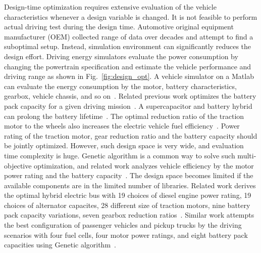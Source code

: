 Design-time optimization requires extensive evaluation of the vehicle characteristics whenever a design variable is changed. It is not feasible to perform actual driving test during the design time. Automotive original equipment manufacturer (OEM) collected range of data over decades and attempt to find a suboptimal setup. Instead, simulation environment can significantly reduces the design effort. Driving energy simulators evaluate the power consumption by changing the powertrain specification and estimate the vehicle performance and driving range as shown in Fig.~\ref{fig:design_opt}. A vehicle simulator on a Matlab can evaluate the energy consumption by the motor, battery characteristics, gearbox, vehicle chassis, and so on~\cite{Butler:TVT99,Markel:JPS02}. Related previous work optimizes the battery pack capacity for a given driving mission~\cite{Gao:TIE10}. A supercapacitor and battery hybrid can prolong the battery lifetime~\cite{Song:AE14}. The optimal reduction ratio of the traction motor to the wheels also increases the electric vehicle fuel efficiency~\cite{Yin:ITEC-AP14}. Power rating of the traction motor, gear reduction ratio and the battery capacity should be jointly optimized. However, such design space is very wide, and evaluation time complexity is huge. Genetic algorithm is a common way to solve such multi-objective optimization, and related work analyzes vehicle efficiency by the motor power rating and the battery capacity~\cite{Pozo:AMAA15}. The design space becomes limited if the available components are in the limited number of libraries. Related work derives the optimal hybrid electric bus with 19 choices of diesel engine power rating, 19 choices of alternator capacites, 28 different size of traction motors, nine battery pack capacity variations, seven gearbox reduction ratios~\cite{Hasanzadeh:INDEL14}. Similar work attempts the best configuration of passenger vehicles and pickup trucks by the driving scenarios with four fuel cells, four motor power ratings, and eight battery pack capacities using Genetic algorithm~\cite{Ribau:AE14}.


